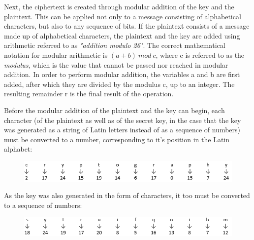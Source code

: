 \documentclass[12pt]{report}
\theoremstyle{definition}
\theoremstyle{remark}
\begin{document}


Next, the ciphertext is created through modular addition of the key and the plaintext. This can be applied not only to a message consisting of alphabetical characters, but also to any sequence of bits. If the plaintext consists of a message made up of alphabetical characters, the plaintext and the key are added using arithmetic referred to as \textit{"addition modulo 26"}. The correct mathematical notation for modular arithmetic is $(a+b)\:mod\:c$, where c is referred to as the \textit{modulus}, which is the value that cannot be passed nor reached in modular addition. In order to perform modular addition, the variables a and b are first added, after which they are divided by the modulus c, up to an integer. The resulting remainder r is the final result of the operation.

Before the modular addition of the plaintext and the key can begin, each character (of the plaintext as well as of the secret key, in the case that the key was generated as a string of Latin letters instead of as a sequence of numbers) must be converted to a number, corresponding to it's position in the Latin alphabet:

\begin{figure}[H]
\centering
\includegraphics[scale=1]{Table1.PNG}		
\end{figure}


As the key was also generated in the form of characters, it too must be converted to a sequence of numbers:

\begin{figure}[H]
\centering
\includegraphics[scale=1]{Table2.PNG}
\end{figure}
\end{document}
